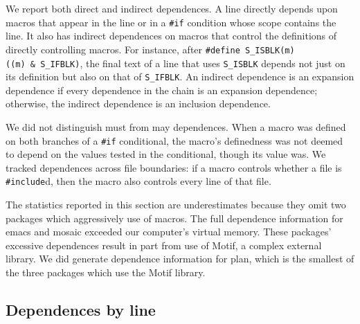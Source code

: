 \documentclass[10pt]{article}
\newcommand{\pkg}[1]{\textsf{#1}}
\begin{document}
We report both direct and indirect dependences.  A line directly depends
upon macros that appear in the line or in a {\tt \#if} condition whose
scope contains the line.  It also has indirect dependences on macros that
control the definitions of directly controlling macros.  For instance,
after {\tt \#define \verb|S_ISBLK|(m) ((m)~\&~\verb|S_IFBLK|)}, the final
text of a line that uses \verb|S_ISBLK| depends not just on its definition
but also on that of \verb|S_IFBLK|.  An indirect dependence is an expansion
dependence if every dependence in the chain is an expansion dependence;
otherwise, the indirect dependence is an inclusion dependence.

We did not distinguish must from may dependences.  When a macro was defined
on both branches of a {\tt \#if} conditional, the macro's definedness was
not deemed to depend on the values tested in the conditional, though its
value was.  We tracked dependences across file boundaries: if a macro
controls whether a file is {\tt \#include}d, then the macro also controls
every line of that file.


The statistics reported in this section are underestimates because they
omit two packages which aggressively use of macros.  The full dependence
information for \pkg{emacs} and \pkg{mosaic} exceeded our computer's
virtual memory.  These packages' excessive dependences result in part from
use of Motif, a complex external library.  We did generate dependence
information for \pkg{plan}, which is the smallest of the three packages
which use the Motif library.


\subsection{Dependences by line}
\end{document}
